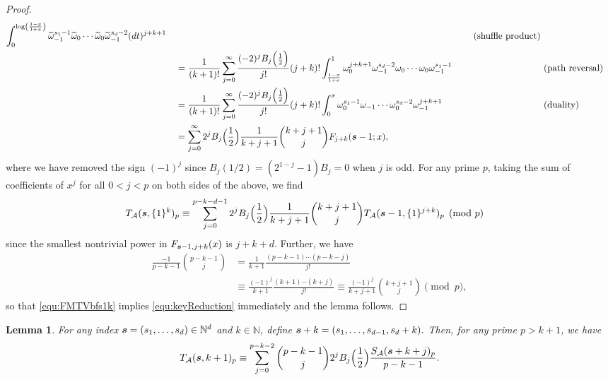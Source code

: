 \documentclass{article}
\newcommand\om{{\omega}}
\newcommand\tom{{\widetilde{\omega}}}
\newcommand{\bfs}{{\boldsymbol{\sl{s}}}}
\newcommand{\calA}{\mathcal{A}}
\newcommand{\N}{\mathbb{N}}
\theoremstyle{plain}
\newtheorem{lem}[thm]{Lemma}
\theoremstyle{definition}
\begin{document}
\begin{proof}
\begin{alignat*}{4}
\int_0^{\log\left(\frac{1-x}{1+x}\right)}
 \tom_{-1}^{s_1-1}\tom_0\cdots
 \tom_0\tom_{-1}^{s_d-2} (dt)^{j+k+1} \quad&&\ \text{(shuffle product)}\\
&=\frac{1}{(k+1)!}\sum_{j=0}^{\infty}\frac{(-2)^jB_j\Big(\frac12\Big)}{j!}(j+k)!
    \int_{\frac{1-x}{1+x}}^{1} \om_0^{j+k+1}\om_{-1}^{s_d-2} \om_0\cdots\om_0\om_{-1}^{s_1-1} \quad&&\ \text{(path reversal)}\\
&=\frac{1}{(k+1)!}\sum_{j=0}^{\infty}\frac{(-2)^jB_j\Big(\frac12\Big)}{j!}(j+k)!
    \int_0^{x}\om_0^{s_1-1}\om_{-1}\cdots\om_0^{s_d-2}\om_{-1}^{j+k+1}\quad&&\ \text{(duality)}\\
&=\sum_{j=0}^{\infty} 2^jB_j\Big(\frac12\Big) \frac{1}{k+j+1} \binom{k+j+1}{j} F_{j+k}(\bfs-1;x),
\end{alignat*}
where we have removed the sign $(-1)^j$ since $B_j(1/2)=(2^{1-j}-1)B_j=0$ when $j$ is odd.
For any prime $p$, taking the sum of coefficients of $x^j$ for all $0<j<p$ on both sides of the above, we find
\begin{align}\label{equ:FMTVbfs1k}
&T_\calA(\bfs,\{1\}^k)_p  \equiv \sum_{j=0}^{p-k-d-1}2^jB_j\Big(\frac12\Big) \frac{1}{k+j+1} \binom{k+j+1}{j} T_\calA(\bfs-1,\{1\}^{j+k})_p    \pmod{p}
\end{align}
since the smallest nontrivial power in $F_{\bfs-1,j+k}(x)$ is $j+k+d$. Further, we have
\begin{align*}
\frac{-1}{p-k-1} \binom{p-k-1}{j}
&=\frac{1}{k+1} \frac{(p-k-1)\cdots(p-k-j)}{j!} \\
&\equiv\frac{(-1)^{j}}{k+1} \frac{(k+1)\cdots(k+j)}{j!}
\equiv\frac{(-1)^{j}}{k+j+1} \binom{k+j+1}{j} \pmod{p},
\end{align*}
so that \eqref{equ:FMTVbfs1k} implies \eqref{equ:keyReduction} immediately and the lemma follows.
\end{proof}

\begin{lem}\label{lem:S(x)}
For any index $\bfs=(s_1,\dots,s_d)\in\N^d$ and $k\in\N$, define $\bfs+k=(s_1,\dots,s_{d-1},s_d+k).$
Then, for any prime $p> k+1$, we have
\begin{align}\label{equ:T2S}
T_\calA(\bfs,k+1)_p\equiv \sum_{j=0}^{p-k-2} \binom{p-k-1}{j}2^jB_j\Big(\frac12\Big)\frac{S_\calA(\bfs+k+j)_p}{p-k-1}.
\end{align}
\end{lem}
\end{document}

